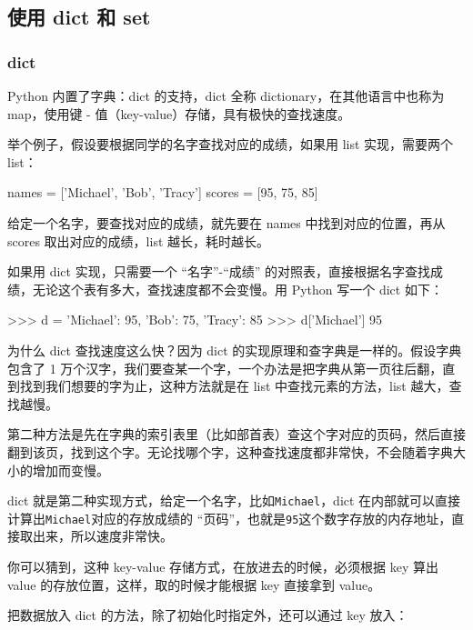 \hypertarget{ux4f7fux7528-dict-ux548c-set}{%
\subsection{使用 dict 和 set}\label{ux4f7fux7528-dict-ux548c-set}}

\hypertarget{dict}{%
\subsubsection{dict}\label{dict}}

Python 内置了字典：dict 的支持，dict 全称 dictionary，在其他语言中也称为
map，使用键 - 值（key-value）存储，具有极快的查找速度。

举个例子，假设要根据同学的名字查找对应的成绩，如果用 list 实现，需要两个
list：

\begin{pythoncode}
names = ['Michael', 'Bob', 'Tracy']
scores = [95, 75, 85]
\end{pythoncode}

给定一个名字，要查找对应的成绩，就先要在 names 中找到对应的位置，再从
scores 取出对应的成绩，list 越长，耗时越长。

如果用 dict 实现，只需要一个 ``名字''-``成绩''
的对照表，直接根据名字查找成绩，无论这个表有多大，查找速度都不会变慢。用
Python 写一个 dict 如下：

\begin{pythoncode}
>>> d = {'Michael': 95, 'Bob': 75, 'Tracy': 85}
>>> d['Michael']
95
\end{pythoncode}

为什么 dict 查找速度这么快？因为 dict
的实现原理和查字典是一样的。假设字典包含了 1
万个汉字，我们要查某一个字，一个办法是把字典从第一页往后翻，直到找到我们想要的字为止，这种方法就是在
list 中查找元素的方法，list 越大，查找越慢。

第二种方法是先在字典的索引表里（比如部首表）查这个字对应的页码，然后直接翻到该页，找到这个字。无论找哪个字，这种查找速度都非常快，不会随着字典大小的增加而变慢。

dict
就是第二种实现方式，给定一个名字，比如\texttt{\textquotesingle{}Michael\textquotesingle{}}，dict
在内部就可以直接计算出\texttt{Michael}对应的存放成绩的
``页码''，也就是\texttt{95}这个数字存放的内存地址，直接取出来，所以速度非常快。

你可以猜到，这种 key-value 存储方式，在放进去的时候，必须根据 key 算出
value 的存放位置，这样，取的时候才能根据 key 直接拿到 value。

把数据放入 dict 的方法，除了初始化时指定外，还可以通过 key 放入：

